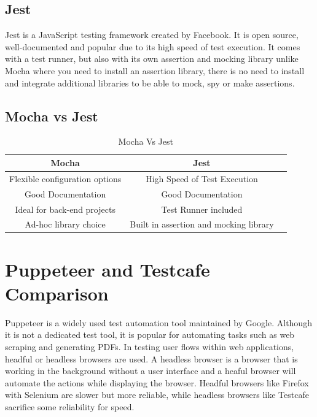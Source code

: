 \documentclass[12pt,a4paper,titlepage]{report}
\begin{document}
\subsection{Jest}

Jest is a JavaScript testing framework created by Facebook. It is open source, well-documented and popular due to its
high speed of test execution. It comes with a test runner, but also with its own assertion and mocking library unlike Mocha where you need to install an assertion
library, there is no need to install and integrate additional libraries to be able to mock, spy or make assertions.

\subsection{Mocha vs Jest}

\begin{table}[ht]
 \centering
 \small
 \setlength\tabcolsep{6pt}
 \begin{tabular}{|c|c|c}
  \hline \textbf
  {Mocha}       & \textbf {Jest}\\
  \hline\hline
  Flexible configuration options & High Speed of Test Execution\\
  \hline
  Good Documentation       & Good Documentation\\
  \hline
  Ideal for back-end projects  & Test Runner included\\
  \hline
  Ad-hoc library choice     & Built in assertion and mocking library\\
  \hline
 \end{tabular}
 \caption{Mocha Vs Jest}
\label{table:mocha:jest}
\end{table}

\section{Puppeteer and Testcafe Comparison}

Puppeteer is a widely used test automation tool maintained by Google. Although it is not a dedicated test tool, it is popular for automating tasks such as web scraping and generating PDFs. 
In testing user flows within web applications, headful or headless browsers are used. A headless browser is a browser that is working in the background without a user interface and a heaful browser will automate the actions while displaying the browser. 
Headful browsers like Firefox with Selenium are slower but more reliable, while headless browsers like Testcafe sacrifice some reliability for speed.
\end{document}
